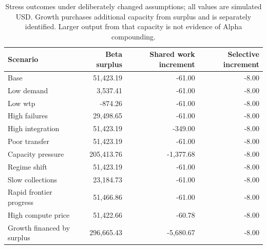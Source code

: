 

\begin{table}[htbp]\centering\footnotesize\begin{tabularx}{\linewidth}{Yrrr}\toprule

Scenario & Beta surplus & Shared work increment & Selective increment\\\midrule

Base & 51,423.19 & -61.00 & -8.00\\

Low demand & 3,537.41 & -61.00 & -8.00\\

Low wtp & -874.26 & -61.00 & -8.00\\

High failures & 29,498.65 & -61.00 & -8.00\\

High integration & 51,423.19 & -349.00 & -8.00\\

Poor transfer & 51,423.19 & -61.00 & -8.00\\

Capacity pressure & 205,413.76 & -1,377.68 & -8.00\\

Regime shift & 51,423.19 & -61.00 & -8.00\\

Slow collections & 23,184.73 & -61.00 & -8.00\\

Rapid frontier progress & 51,466.86 & -61.00 & -8.00\\

High compute price & 51,422.66 & -60.78 & -8.00\\

Growth financed by surplus & 296,665.43 & -5,680.67 & -8.00\\

\bottomrule\end{tabularx}\caption{Stress outcomes under deliberately changed assumptions; all values are simulated USD. Growth purchases additional capacity from surplus and is separately identified. Larger output from that capacity is not evidence of Alpha compounding.}\end{table}


